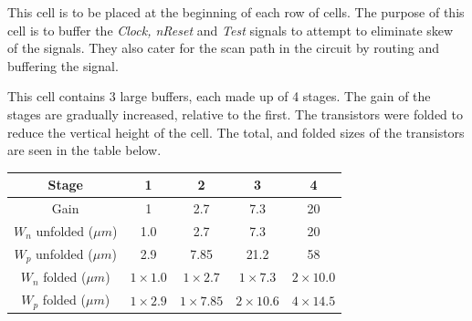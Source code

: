 
This cell is to be placed at the beginning of each row of cells. 
The purpose of this cell is to buffer the \textit{Clock, nReset} and \textit{Test} signals to attempt to eliminate skew of the signals.
They also cater for the scan path in the circuit by routing and buffering the signal.

This cell contains 3 large buffers, each made up of 4 stages.
The gain of the stages are gradually increased, relative to the first. 
The transistors were folded to reduce the vertical height of the cell. 
The total, and folded sizes of the transistors are seen in the table below.

\begin{table}[htb!]
\centering
\begin{tabular}{c|cccc}
Stage						&	1				&	2		&	3		&	4 \\ \hline
Gain 						& 	1 				& 	2.7 	& 	7.3 	& 	20 \\
$W_n$ unfolded 	($\mu m$) 	&	1.0 			& 	2.7 	& 	7.3 	& 	20 \\
$W_p$ unfolded	($\mu m$)	& 	2.9				& 	7.85 	& 	21.2 	& 	58 \\
$W_n$ folded	($\mu m$)	&	$1 \times 1.0$ 	& 	$1 \times 2.7$ 		& 	$1 \times 7.3$ 		& 	$2 \times 10.0$ \\
$W_p$ folded	($\mu m$)	&	$1 \times 2.9$ 	& 	$1 \times 7.85$ 	& 	$2 \times 10.6$ 	& 	$4 \times 14.5$ \\
\end{tabular}
\end{table}


